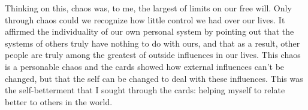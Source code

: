 Thinking on this, chaos was, to me, the largest of limits on our free will. Only through chaos could we recognize how little control we had over our lives. It affirmed the individuality of our own personal system by pointing out that the systems of others truly have nothing to do with ours, and that as a result, other people are truly among the greatest of outside influences in our lives. This chaos is a personable chaos and the cards showed how external influences can't be changed, but that the self can be changed to deal with these influences. This was the self-betterment that I sought through the cards: helping myself to relate better to others in the world.

